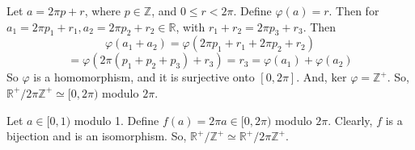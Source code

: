 \begin{itemize}
Let $a = 2\pi p + r$, where $p \in \mathbb{Z}$, and $0 \leq r < 2\pi$. Define $\varphi(a) = r$. Then for $a_1 = 2 \pi p_1 + r_1, a_2 = 2\pi p_2 + r_2 \in \mathbb{R}$, with $r_1 + r_2 = 2\pi p_3 + r_3$. Then
$$\varphi(a_1 + a_2) = \varphi(2\pi p_1 + r_1 + 2\pi p_2 + r_2)$$
$$= \varphi(2\pi(p_1 + p_2 + p_3) + r_3) = r_3 = \varphi(a_1) + \varphi(a_2)$$
So $\varphi$ is a homomorphism, and it is surjective onto $[0, 2\pi]$. And, $\text{ker }\varphi = \mathbb{Z}^+$. So, $\mathbb{R}^+/2\pi\mathbb{Z}^+ \simeq [0, 2\pi)$ modulo $2\pi$.

Let $a \in [0, 1)$ modulo 1. Define $f(a) = 2\pi a \in [0, 2\pi)$ modulo $2\pi$. Clearly, $f$ is a bijection and is an isomorphism. So, $\mathbb{R}^+/\mathbb{Z}^+ \simeq \mathbb{R}^+/2\pi\mathbb{Z}^+$.
\end{itemize}
%
